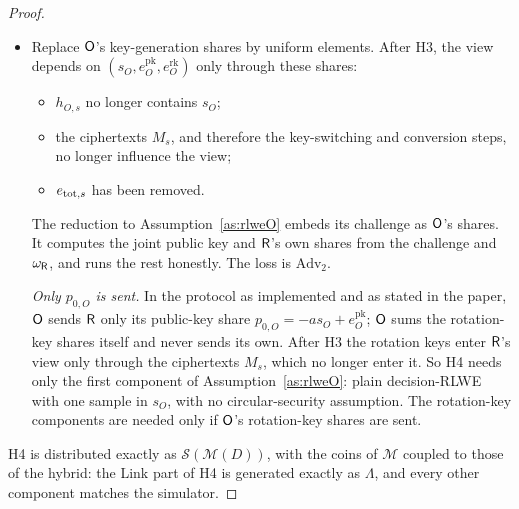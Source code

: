 \begin{proof}
\begin{itemize}[nosep]
  The reduction to Assumption~\ref{as:rlweu} works as follows. On a challenge $(a^*,b^*)$, it sets $a$ to a uniform CRT lift of $a^*$, so that $a$ is uniform at the full modulus. It samples $s_O$, all keys, all errors and all other releases itself; it knows $D$. It sets $c'_{1,s}=c_{1,s}+b^*$. Releases $s'<s$ are already uniform and releases $s'>s$ are real, and both are computable because the reduction knows $a$. The loss per release is $\mathrm{Adv}_1$. Fresh $u_s$ per release is essential here. If $u$ were reused, then $c'_{1,s}-c'_{1,s'}$ would equal $c_{1,s}-c_{1,s'}+e_{1,s}-e_{1,s'}$. That is a short perturbation of a deterministic function of the data and the public randomness, and the hybrid would fail.
  \item[\textbf{H4}] Replace $\mathsf{O}$'s key-generation shares by uniform elements. After H3, the view depends on $(s_O,e^{\mathrm{pk}}_O,e^{\mathrm{rk}}_O)$ only through these shares:
    \begin{itemize}[nosep]
      \item $h_{O,s}$ no longer contains $s_O$;
      \item the ciphertexts $M_s$, and therefore the key-switching and conversion steps, no longer influence the view;
      \item $e_{\mathrm{tot},s}$ has been removed.
    \end{itemize}
  The reduction to Assumption~\ref{as:rlweO} embeds its challenge as $\mathsf{O}$'s shares. It computes the joint public key and $\mathsf{R}$'s own shares from the challenge and $\omega_{\mathsf{R}}$, and runs the rest honestly. The loss is $\mathrm{Adv}_2$.

  \emph{Only $p_{0,O}$ is sent.} In the protocol as implemented and as stated in the paper, $\mathsf{O}$ sends $\mathsf{R}$ only its public-key share $p_{0,O}=-as_O+e^{\mathrm{pk}}_O$; $\mathsf{O}$ sums the rotation-key shares itself and never sends its own. After H3 the rotation keys enter $\mathsf{R}$'s view only through the ciphertexts $M_s$, which no longer enter it. So H4 needs only the first component of Assumption~\ref{as:rlweO}: plain decision-RLWE with one sample in $s_O$, with no circular-security assumption. The rotation-key components are needed only if $\mathsf{O}$'s rotation-key shares are sent.
\end{itemize}
H4 is distributed exactly as $\mathcal S(\mathcal M(D))$, with the coins of $\mathcal M$ coupled to those of the hybrid: the Link part of H4 is generated exactly as $\Lambda$, and every other component matches the simulator.
\end{proof}

